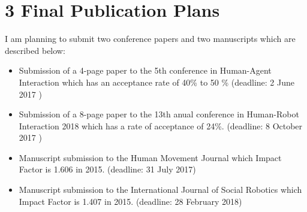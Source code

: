 \documentclass{sigchi}
\begin{document}
\section{3 Final Publication Plans}
I am planning to submit two conference papers and two manuscripts which
are described below:
\begin{itemize}
  \setlength{\itemsep}{0pt}
  \setlength{\parskip}{0pt}
  \item Submission of a 4-page paper to the 5th conference in Human-Agent
  Interaction which has an acceptance rate of 40\% to 50 \% (deadline: 2 June 2017 )
  \item Submission of a 8-page paper to the 13th anual conference in Human-Robot
  Interaction 2018 which has a rate of acceptance of 24\%. (deadline: 8 October 2017 )
  \item Manuscript submission to the Human Movement Journal which Impact Factor
  is 1.606 in 2015. (deadline: 31 July 2017)
  \item Manuscript submission to the International Journal of Social Robotics
  which Impact Factor is 1.407 in 2015. (deadline: 28 February 2018)
\end{itemize}









\end{document}
